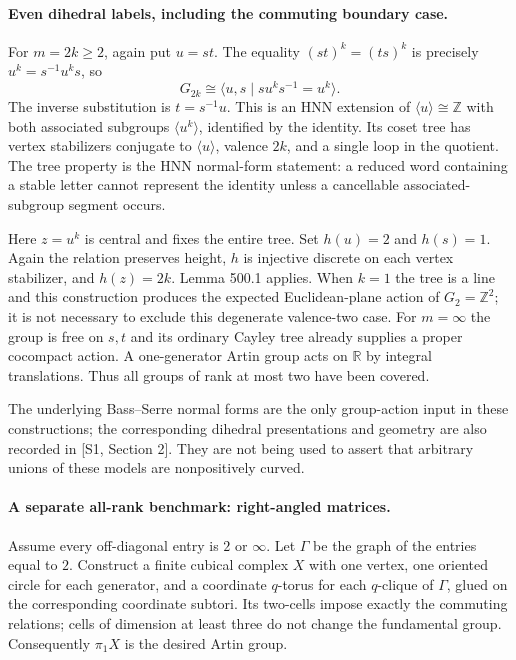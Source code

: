 \documentclass[11pt]{article}
\begin{document}
\paragraph{Even dihedral labels, including the commuting boundary case.}
For $m=2k\ge2$, again put $u=st$. The equality
$(st)^k=(ts)^k$ is precisely $u^k=s^{-1}u^ks$, so
\begin{equation}\label{ra500:even}
 G_{2k}\cong\langle u,s\mid su^ks^{-1}=u^k\rangle.
\end{equation}
The inverse substitution is $t=s^{-1}u$. This is an HNN extension of
$\langle u\rangle\cong\mathbb Z$ with both associated subgroups
$\langle u^k\rangle$, identified by the identity. Its coset tree has
vertex stabilizers conjugate to $\langle u\rangle$, valence $2k$, and a
single loop in the quotient. The tree property is the HNN normal-form
statement: a reduced word containing a stable letter cannot represent the
identity unless a cancellable associated-subgroup segment occurs.

Here $z=u^k$ is central and fixes the entire tree. Set $h(u)=2$ and
$h(s)=1$. Again the relation preserves height, $h$ is injective discrete
on each vertex stabilizer, and $h(z)=2k$. Lemma 500.1 applies.
When $k=1$ the tree is a line and this construction produces the expected
Euclidean-plane action of $G_2=\mathbb Z^2$; it is not necessary to exclude
this degenerate valence-two case. For $m=\infty$ the group is free on
$s,t$ and its ordinary Cayley tree already supplies a proper cocompact
action. A one-generator Artin group acts on $\mathbb R$ by integral
translations. Thus all groups of rank at most two have been covered.

The underlying Bass--Serre normal forms are the only group-action input
in these constructions; the corresponding dihedral presentations and
geometry are also recorded in [S1, Section 2]. They are not being used to
assert that arbitrary unions of these models are nonpositively curved.

\paragraph{A separate all-rank benchmark: right-angled matrices.}
Assume every off-diagonal entry is $2$ or $\infty$. Let $\Gamma$ be the
graph of the entries equal to $2$. Construct a finite cubical complex $X$
with one vertex, one oriented circle for each generator, and a coordinate
$q$-torus for each $q$-clique of $\Gamma$, glued on the corresponding
coordinate subtori. Its two-cells impose exactly the commuting relations;
cells of dimension at least three do not change the fundamental group.
Consequently $\pi_1X$ is the desired Artin group.
\end{document}
